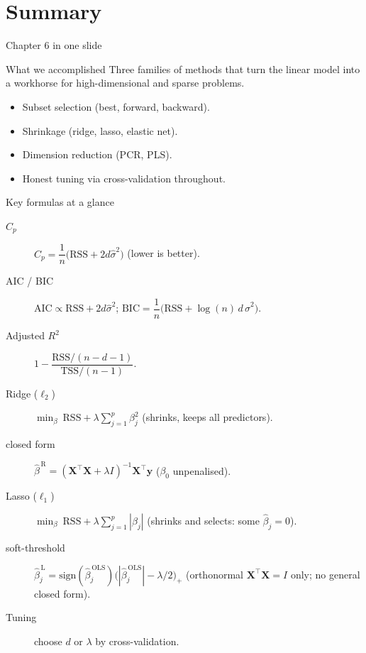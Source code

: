 \documentclass[aspectratio=169,11pt]{beamer}
\begin{document}
\section{Summary}

\begin{frame}{Chapter 6 in one slide}
  \begin{block}{What we accomplished}
    Three families of methods that turn the linear model into a
    workhorse for high-dimensional and sparse problems.
  \end{block}
  \begin{itemize}
    \item Subset selection (best, forward, backward).
    \item Shrinkage (ridge, lasso, elastic net).
    \item Dimension reduction (PCR, PLS).
    \item Honest tuning via cross-validation throughout.
  \end{itemize}
\end{frame}

\begin{frame}{Key formulas at a glance}
  \footnotesize
  \begin{description}
    \item[$C_p$] $C_p=\dfrac1n\big(\mathrm{RSS}+2d\hat\sigma^2\big)$ \quad (lower is better).
    \item[AIC / BIC] $\mathrm{AIC}\propto \mathrm{RSS}+2d\hat\sigma^2$; \quad $\mathrm{BIC}=\dfrac1n\big(\mathrm{RSS}+\log(n)\,d\,\hat\sigma^2\big)$.
    \item[Adjusted $R^2$] $1-\dfrac{\mathrm{RSS}/(n-d-1)}{\mathrm{TSS}/(n-1)}$.
    \item[Ridge ($\ell_2$)] $\min_\beta\ \mathrm{RSS}+\lambda\sum_{j=1}^p\beta_j^2$ \quad (shrinks, keeps all predictors).
    \item[\quad closed form] $\hat\beta^{\,\mathrm R} = (\mathbf{X}^\top \mathbf{X} + \lambda I)^{-1}\mathbf{X}^\top \mathbf{y}$ \quad ($\beta_0$ unpenalised).
    \item[Lasso ($\ell_1$)] $\min_\beta\ \mathrm{RSS}+\lambda\sum_{j=1}^p|\beta_j|$ \quad (shrinks and selects: some $\hat\beta_j=0$).
    \item[\quad soft-threshold] $\hat\beta_j^{\,\mathrm L} = \mathrm{sign}(\hat\beta_j^{\,\mathrm{OLS}})\bigl(|\hat\beta_j^{\,\mathrm{OLS}}| - \lambda/2\bigr)_{+}$ \quad (orthonormal $\mathbf{X}^\top\mathbf{X}=I$ only; no general closed form).
    \item[Tuning] choose $d$ or $\lambda$ by cross-validation.
  \end{description}
\end{frame}
\end{document}
